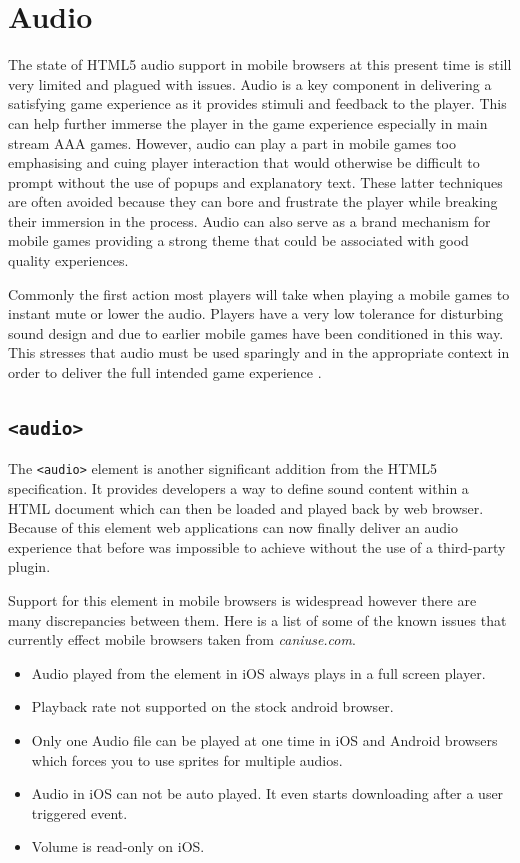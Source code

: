 \documentclass[final]{cmpreport}
\begin{document}
\section{Audio}
The state of HTML5 audio support in mobile browsers at this present time is still very limited and plagued with issues. Audio is a key component in delivering a satisfying game experience as it provides stimuli and feedback to the player. This can help further immerse the player in the game experience especially in main stream AAA games. However, audio can play a part in mobile games too emphasising and cuing player interaction that would otherwise be difficult to prompt without the use of popups and explanatory text. These latter techniques are often avoided because they can bore and frustrate the player while breaking their immersion in the process. Audio can also serve as a brand mechanism for mobile games providing a strong theme that could be associated with good quality experiences.

Commonly the first action most players will take when playing a mobile games to instant mute or lower the audio. Players have a very low tolerance for disturbing sound design and due to earlier mobile games have been conditioned in this way. This stresses that audio must be used sparingly and in the appropriate context in order to deliver the full intended game experience \cite{Thomas}.

\subsection{\texttt{<audio>}}
The \texttt{<audio>} element is another significant addition from the HTML5 specification. It provides developers a way to define sound content within a HTML document which can then be loaded and played back by web browser. Because of this element web applications can now finally deliver an audio experience that before was impossible to achieve without the use of a third-party plugin.

Support for this element in mobile browsers is widespread however there are many discrepancies between them. Here is a list of some of the known issues that currently effect mobile browsers taken from \textit{caniuse.com\footnotemark}.


\begin{itemize}
  \item Audio played from the element in iOS always plays in a full screen player.
  \item Playback rate not supported on the stock android browser.
  \item Only one Audio file can be played at one time in iOS and Android browsers which forces you to use sprites for multiple audios.
  \item Audio in iOS can not be auto played. It even starts downloading after a user triggered event.
  \item Volume is read-only on iOS.
\end{itemize}
\end{document}
